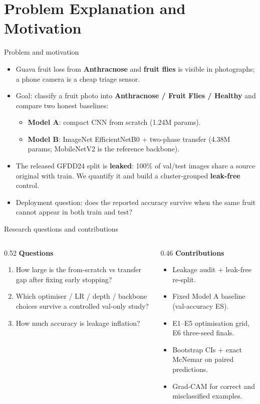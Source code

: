 \documentclass[aspectratio=169]{beamer}
\begin{document}
\section{Problem Explanation and Motivation}
\begin{frame}{Problem and motivation}
  \begin{itemize}
    \item Guava fruit loss from \textbf{Anthracnose} and \textbf{fruit flies} is
          visible in photographs; a phone camera is a cheap triage sensor.
    \item Goal: classify a fruit photo into \textbf{Anthracnose / Fruit Flies /
          Healthy} and compare two honest baselines:
      \begin{itemize}
        \item \textbf{Model A}: compact CNN from scratch (1.24M params).
        \item \textbf{Model B}: ImageNet EfficientNetB0 + two-phase transfer
              (4.38M params; MobileNetV2 is the reference backbone).
      \end{itemize}
    \item The released GFDD24 split is \textbf{leaked}: 100\% of val/test
          images share a source original with train. We quantify it and build
          a cluster-grouped \textbf{leak-free} control.
    \item Deployment question: does the reported accuracy survive when the
          same fruit cannot appear in both train and test?
  \end{itemize}
\end{frame}
\begin{frame}{Research questions and contributions}
  \begin{columns}[T]
    \begin{column}{0.52\textwidth}
      \textbf{Questions}
      \begin{enumerate}
        \item How large is the from-scratch vs transfer gap after fixing
              early stopping?
        \item Which optimiser / LR / depth / backbone choices survive a
              controlled val-only study?
        \item How much accuracy is leakage inflation?
      \end{enumerate}
    \end{column}
    \begin{column}{0.46\textwidth}
      \textbf{Contributions}
      \begin{itemize}
        \item Leakage audit + leak-free re-split.
        \item Fixed Model A baseline (val-accuracy ES).
        \item E1--E5 optimisation grid, E6 three-seed finals.
        \item Bootstrap CIs + exact McNemar on paired predictions.
        \item Grad-CAM for correct and misclassified examples.
      \end{itemize}
    \end{column}
  \end{columns}
\end{frame}
\end{document}

